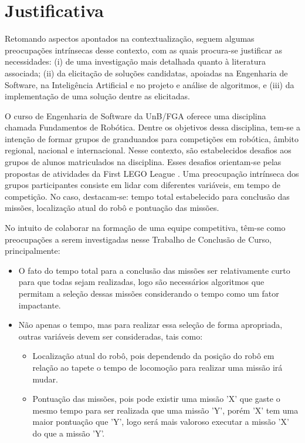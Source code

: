 \section{Justificativa}

Retomando aspectos apontados na contextualização, seguem algumas preocupações intrínsecas desse contexto, com as quais procura-se justificar as necessidades: (i) de uma investigação mais detalhada quanto à literatura associada; (ii) da elicitação de soluções candidatas, apoiadas na Engenharia de Software, na Inteligência Artificial e no projeto e análise de algoritmos, e (iii) da implementação de uma solução dentre as elicitadas.

O curso de Engenharia de Software da UnB/FGA oferece uma disciplina chamada Fundamentos de Robótica. Dentre os objetivos dessa disciplina, tem-se a intenção de formar grupos de granduandos para competições em robótica, âmbito regional, nacional e internacional. Nesse contexto, são estabelecidos desafios aos grupos de alunos matriculados na disciplina. Esses desafios orientam-se pelas propostas de atividades da First LEGO League \cite{kamenfirst}. Uma preocupação intrínseca dos grupos participantes consiste em lidar com diferentes variáveis, em tempo de competição. No caso, destacam-se: tempo total estabelecido para conclusão das missões, localização atual do robô e pontuação das missões.

No intuito de colaborar na formação de uma equipe competitiva, têm-se como preocupações a serem investigadas nesse Trabalho de Conclusão de Curso, principalmente:

\begin{itemize}
\item O fato do tempo total para a conclusão das missões ser relativamente curto para que todas sejam realizadas, logo são necessários algoritmos que permitam a seleção dessas missões considerando o tempo como um fator impactante.

\item Não apenas o tempo, mas para realizar essa seleção de forma apropriada, outras variáveis devem ser consideradas, tais como: 
\begin{itemize}
\item Localização atual do robô, pois dependendo da posição do robô em relação ao tapete o tempo de locomoção para realizar uma missão irá mudar.   
\item Pontuação das missões, pois pode existir uma missão 'X' que gaste o mesmo tempo para ser realizada que uma missão 'Y', porém 'X' tem uma maior pontuação que 'Y', logo será mais valoroso executar a missão 'X' do que a missão 'Y'.
\end{itemize} 
\end{itemize}
 

